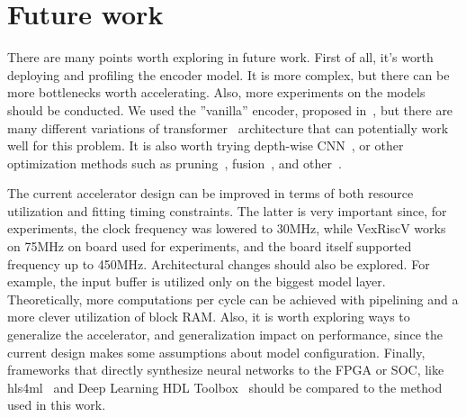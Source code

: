 \section{Future work}
There are many points worth exploring in future work. First of all, it's worth deploying and profiling the encoder model. It is more complex, but there can be more bottlenecks worth accelerating. Also, more experiments on the models should be conducted. We used the ''vanilla'' encoder, proposed in~\cite{attention_is_all_you_need}, but there are many different variations of transformer~\cite{different_transformers} architecture that can potentially work well for this problem. It is also worth trying depth-wise CNN~\cite{depth_wise_convolution_original,mobile_net,xception}, or other optimization methods such as pruning~\cite{cnn_pruning,cnn_pruning2}, fusion~\cite{cnn_fusion}, and other~\cite{ofa_network,speeding_up_survey}.

The current accelerator design can be improved in terms of both resource utilization and fitting timing constraints. The latter is very important since, for experiments, the clock frequency was lowered to 30MHz, while VexRiscV works on 75MHz on board used for experiments, and the board itself supported frequency up to 450MHz. Architectural changes should also be explored. For example, the input buffer is utilized only on the biggest model layer. Theoretically, more computations per cycle can be achieved with pipelining and a more clever utilization of block RAM. Also, it is worth exploring ways to generalize the accelerator, and generalization impact on performance, since the current design makes some assumptions about model configuration. Finally, frameworks that directly synthesize neural networks to the FPGA or SOC, like hls4ml~\cite{hls4ml} and Deep Learning HDL Toolbox~\cite{matbal_dl_hdl_documentation} should be compared to the method used in this work.